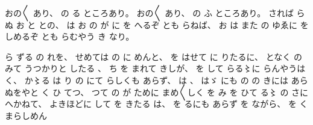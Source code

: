 
%
おの〳〵
あり、
%
の
る
ところあり。
%
おの〳〵
あり、%
%
の%
ふ
ところあり。
%
されば
らぬ
お
と
との、
%
は
お
の
が
に
を
へるぞ
とも
らねば、
%
お
は
また
の
ゆゑに
を
しめるぞ
とも
らむやう
き
なり。

%
ら
ずる
の
れを、
%
せめては
の
に
めんと、
%
を
はせて
に
りたるに、
%
となく
の
みて
うつかりと
したる
、
%
ち
を
まれて
きしが、
%
を%
して
らる〻に%
らんやうは
く、
%
か〻る%
は
り
の
にて
らしくも
あらず、
%
は
、
%
はゞ%
にも
の%
の
きには
あらぬをやと
く
ひ
てつ、
%
つて
の
が
ために
まめ〳〵しく
を
み%
を
ひて
る〻%
の
さに
へかねて、
%
よきほどに
して
を
きたる
は、
%
を
るにも
あらず
を%
ながら、
%
%
を
く
まらしめん
